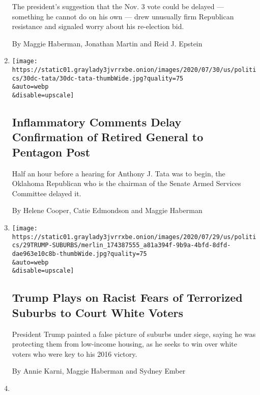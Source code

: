 \begin{enumerate}
  The president's suggestion that the Nov. 3 vote could be delayed ---
  something he cannot do on his own --- drew unusually firm Republican
  resistance and signaled worry about his re-election bid.

  By Maggie Haberman, Jonathan Martin and Reid J. Epstein
\item
  \href{/2020/07/30/us/politics/trump-inhofe-tata-pentagon.html}{}

  \texttt{[image: https://static01.graylady3jvrrxbe.onion/images/2020/07/30/us/politics/30dc-tata/30dc-tata-thumbWide.jpg?quality=75\\\&auto=webp\\\&disable=upscale]}

  \hypertarget{inflammatory-comments-delay-confirmation-of-retired-general-to-pentagon-post}{%
  \subsection{Inflammatory Comments Delay Confirmation of Retired
  General to Pentagon
  Post}\label{inflammatory-comments-delay-confirmation-of-retired-general-to-pentagon-post}}

  Half an hour before a hearing for Anthony J. Tata was to begin, the
  Oklahoma Republican who is the chairman of the Senate Armed Services
  Committee delayed it.

  By Helene Cooper, Catie Edmondson and Maggie Haberman
\item
  \href{/2020/07/29/us/politics/trump-suburbs-housing-white-voters.html}{}

  \texttt{[image: https://static01.graylady3jvrrxbe.onion/images/2020/07/29/us/politics/29TRUMP-SUBURBS/merlin\_174387555\_a81a394f-9b9a-4bfd-8dfd-dae963e10c8b-thumbWide.jpg?quality=75\\\&auto=webp\\\&disable=upscale]}

  \hypertarget{trump-plays-on-racist-fears-of-terrorized-suburbs-to-court-white-voters}{%
  \subsection{Trump Plays on Racist Fears of Terrorized Suburbs to Court
  White
  Voters}\label{trump-plays-on-racist-fears-of-terrorized-suburbs-to-court-white-voters}}

  President Trump painted a false picture of suburbs under siege, saying
  he was protecting them from low-income housing, as he seeks to win
  over white voters who were key to his 2016 victory.

  By Annie Karni, Maggie Haberman and Sydney Ember
\item
  \href{/2020/07/29/us/protests-portland-federal-withdrawal.html}{}


\end{enumerate}
